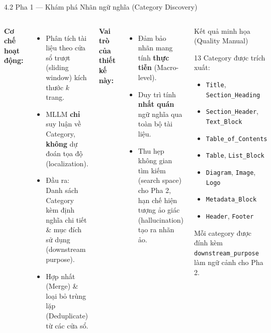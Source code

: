 \documentclass[aspectratio=1610,8pt]{beamer}
\begin{document}
\begin{frame}{4.2 \; Pha 1 — Khám phá Nhãn ngữ nghĩa (Category Discovery)}
    \begin{columns}[T]
        \textbf{Cơ chế hoạt động:}
        \begin{itemize}
            \item Phân tích tài liệu theo cửa sổ trượt (sliding window) kích thước $k$ trang.
            \item MLLM \textbf{chỉ} suy luận về Category, \textbf{không} dự đoán tọa độ (localization).
            \item Đầu ra: Danh sách Category kèm định nghĩa chi tiết \& mục đích sử dụng (downstream purpose).
            \item Hợp nhất (Merge) \& loại bỏ trùng lặp (Deduplicate) từ các cửa sổ.
        \end{itemize}

        \vspace{0.5em}
        \textbf{Vai trò của thiết kế này:}
        \begin{itemize}
            \item Đảm bảo nhãn mang tính \textbf{thực tiễn} (Macro-level).
            \item Duy trì tính \textbf{nhất quán} ngữ nghĩa qua toàn bộ tài liệu.
            \item Thu hẹp không gian tìm kiếm (search space) cho Pha 2, hạn chế hiện tượng ảo giác (hallucination) tạo ra nhãn ảo.
        \end{itemize}

        \begin{exampleblock}{Kết quả minh họa (Quality Manual)}
            {\scriptsize
            13 Category được trích xuất:
            \begin{itemize}
                \item \texttt{Title}, \texttt{Section\_Heading}
                \item \texttt{Section\_Header}, \texttt{Text\_Block}
                \item \texttt{Table\_of\_Contents}
                \item \texttt{Table}, \texttt{List\_Block}
                \item \texttt{Diagram}, \texttt{Image}, \texttt{Logo}
                \item \texttt{Metadata\_Block}
                \item \texttt{Header}, \texttt{Footer}
            \end{itemize}
            Mỗi category được đính kèm \texttt{downstream\_purpose} làm ngữ cảnh cho Pha 2.
            }
        \end{exampleblock}
    \end{columns}
\end{frame}
\end{document}
